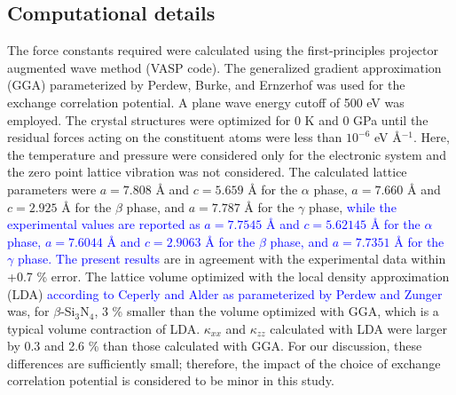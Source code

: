 \documentclass[twocolumn,amsmath,amssymb,a4paper,prb,superscriptaddress,floatfix]{revtex4-1}
\begin{document}
\subsection{Computational details}

The force constants required were calculated using the first-principles
projector augmented wave method\cite{paw} (VASP code\cite{vasp-1996,vasp-1995,
vasp-1999}). The generalized gradient approximation (GGA) parameterized by
Perdew, Burke, and Ernzerhof\cite{pbe} was used for the exchange correlation
potential. A plane wave energy cutoff of 500 eV was employed. The crystal
structures were optimized for 0 K and 0 GPa until the residual forces acting on
the constituent atoms were less than $10^{-6}$ eV \AA$^{-1}$. Here, the
temperature and pressure were considered only for the electronic system and the
zero point lattice vibration was not considered. The calculated lattice
parameters were $a=7.808$ {\AA} and $c=5.659$ {\AA} for the $\alpha$ phase,
$a=7.660$ {\AA} and $c=2.925$ {\AA} for the $\beta$ phase, and $a=7.787$ {\AA}
for the $\gamma$ phase, \textcolor{blue}{while the experimental values are
	reported as $a=7.7545$ {\AA} and $c=5.62145$ {\AA} for the $\alpha$
phase\cite{yashima}, $a=7.6044$ {\AA} and $c=2.9063$ {\AA} for the $\beta$
phase\cite{boulay}, and $a=7.7351$ {\AA} for the $\gamma$
phase\cite{paszkowicz}. The present results} are in agreement with the
experimental data within +0.7 \% error. The lattice volume optimized with the
local density approximation (LDA) \textcolor{blue}{according to Ceperly and
Alder as parameterized by Perdew and Zunger\cite{lda,lda-pz}} was, for
$\beta$-Si$_3$N$_4$, 3 \% smaller than the volume optimized with GGA, which is a
typical volume contraction of LDA.  $\kappa_{xx}$ and $\kappa_{zz}$ calculated
with LDA were larger by 0.3 and 2.6 \% than those calculated with GGA. For our
discussion, these differences are sufficiently small; therefore, the impact of
the choice of exchange correlation potential is considered to be minor in this
study.
\end{document}
